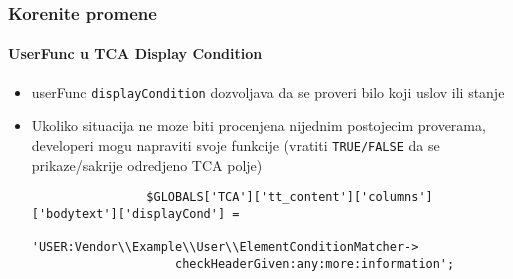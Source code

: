 \begin{frame}[fragile]
	\frametitle{Korenite promene}
	\framesubtitle{UserFunc u TCA Display Condition}

	\begin{itemize}
		\item userFunc \texttt{displayCondition} dozvoljava da se proveri bilo koji uslov ili stanje
		\item Ukoliko situacija ne moze biti procenjena nijednim postojecim proverama, developeri mogu napraviti svoje funkcije\newline
			(vratiti \texttt{TRUE/FALSE} da se prikaze/sakrije odredjeno TCA polje)

			\begin{lstlisting}
				$GLOBALS['TCA']['tt_content']['columns']['bodytext']['displayCond'] =
				  'USER:Vendor\\Example\\User\\ElementConditionMatcher->
				    checkHeaderGiven:any:more:information';
			\end{lstlisting}

	\end{itemize}

\end{frame}



